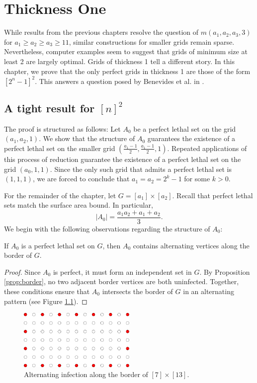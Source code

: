\chapter{Thickness One}

While results from the previous chapters resolve the question of $m(a_1,a_2,a_3,3)$ for $a_1 \geq a_2 \geq a_3 \geq 11$, similar constructions for smaller grids remain sparse. Nevertheless, computer examples seem to suggest that grids of minimum size at least 2 are largely optimal. Grids of thickness 1 tell a different story. In this chapter, we prove that the only perfect grids in thickness 1 are those of the form $[2^n-1]^2$. This answers a question posed by Benevides et al. in \cite{benevides}.

\section{A tight result for $[n]^2$}
The proof is structured as follows: Let $A_0$ be a perfect lethal set on the grid $(a_1, a_2, 1)$. We show that the structure of $A_0$ guarantees the existence of a perfect lethal set on the smaller grid $(\frac{a_1-1}{2}, \frac{a_1-1}{2}, 1)$. Repeated applications of this process of reduction guarantee the existence of a perfect lethal set on the grid $(a_0, 1,1)$. Since the only such grid that admits a perfect lethal set is $(1,1,1)$, we are forced to conclude that $a_1 = a_2 = 2^k-1$ for some $k > 0$. 

For the remainder of the chapter, let $G = [a_1] \times [a_2]$. Recall that perfect lethal sets match the surface area bound. In particular,
$$|A_0| = \frac{a_1a_2 + a_1 + a_2}{3}.$$
We begin with the following observations regarding the structure of $A_0$:

\begin{prop}
\label{prop:alternating_border}
If $A_0$ is a perfect lethal set on $G$, then $A_0$ contains alternating vertices along the border of $G$. 
\end{prop}

\begin{proof}
Since $A_0$ is perfect, it must form an independent set in $G$. By Proposition \ref{prop:border}, no two adjacent border vertices are both uninfected. Together, these conditions ensure that $A_0$ intersects the border of $G$ in an alternating pattern (see Figure \ref{fig:border}). 
\end{proof}

\begin{figure}[]
\centering
\includegraphics[width=0.5\textwidth]{figures/6/border.pdf}
\caption{Alternating infection along the border of $[7] \times [13]$.}
\label{fig:border}
\end{figure} 

